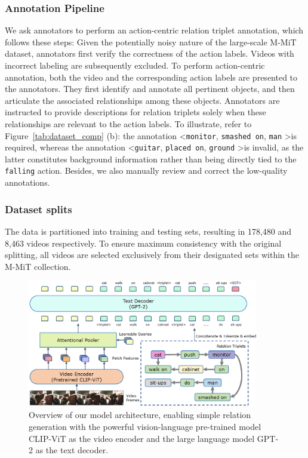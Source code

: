 \documentclass[letterpaper]{article}
\begin{document}
\subsubsection{Annotation Pipeline}
We ask annotators to perform an action-centric relation triplet annotation, which follows these steps:
Given the potentially noisy nature of the large-scale M-MiT dataset, annotators first verify the correctness of the action labels. Videos with incorrect labeling are subsequently excluded.
To perform action-centric annotation, both the video and the corresponding action labels are presented to the annotators. They first identify and annotate all pertinent objects, and then articulate the associated relationships among these objects.
Annotators are instructed to provide descriptions for relation triplets solely when these relationships are relevant to the action labels.
To illustrate, refer to Figure~\ref{tab:dataset_comp} (b): the annotation \textless \texttt{monitor}, \texttt{smashed on}, \texttt{man} \textgreater is required, whereas the annotation \textless \texttt{guitar}, \texttt{placed on}, \texttt{ground} \textgreater is invalid, as the latter constitutes background information rather than being directly tied to the \texttt{falling} action.
Besides, we also manually review and correct the low-quality annotations.

\subsubsection{Dataset splits}
The data is partitioned into training and testing sets, resulting in 178,480 and 8,463 videos respectively.
To ensure maximum consistency with the original splitting, all videos are selected exclusively from their designated sets within the M-MiT collection.
\begin{figure}[t]
\centering
\includegraphics[width=0.9\textwidth]{fig/model-.png}
\caption{Overview of our model architecture, enabling simple relation generation with the powerful vision-language pre-trained model CLIP-ViT as the video encoder and the large language model GPT-2 as the text decoder.
}
\label{fig:arch}
\end{figure}
\end{document}
